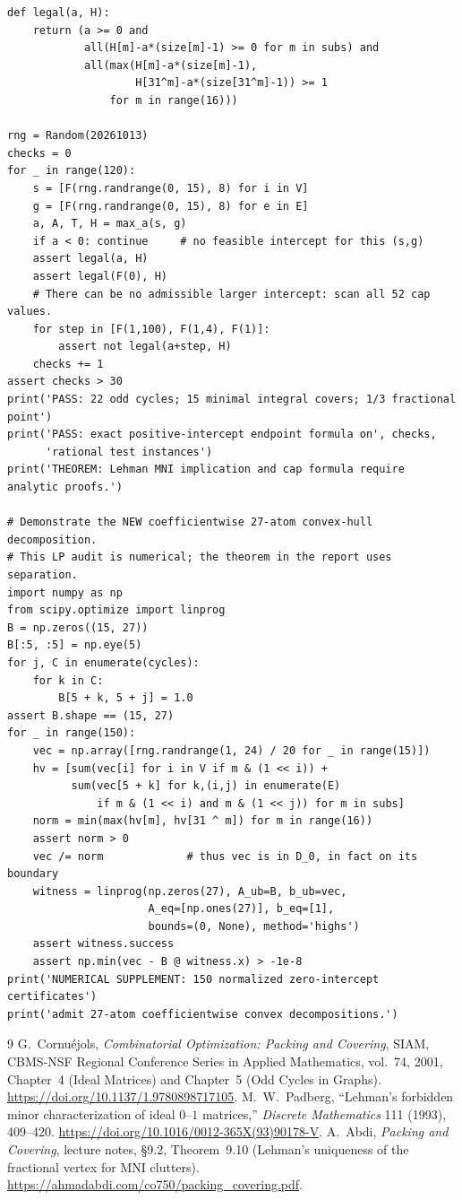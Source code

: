 \documentclass[11pt,a4paper]{ctexart}
\theoremstyle{remark}
\begin{document}
\begin{lstlisting}[caption={D2\_K5\_oddcycle\_positive\_active\_audit.py}]
def legal(a, H):
    return (a >= 0 and
            all(H[m]-a*(size[m]-1) >= 0 for m in subs) and
            all(max(H[m]-a*(size[m]-1),
                    H[31^m]-a*(size[31^m]-1)) >= 1
                for m in range(16)))

rng = Random(20261013)
checks = 0
for _ in range(120):
    s = [F(rng.randrange(0, 15), 8) for i in V]
    g = [F(rng.randrange(0, 15), 8) for e in E]
    a, A, T, H = max_a(s, g)
    if a < 0: continue     # no feasible intercept for this (s,g)
    assert legal(a, H)
    assert legal(F(0), H)
    # There can be no admissible larger intercept: scan all 52 cap values.
    for step in [F(1,100), F(1,4), F(1)]:
        assert not legal(a+step, H)
    checks += 1
assert checks > 30
print('PASS: 22 odd cycles; 15 minimal integral covers; 1/3 fractional point')
print('PASS: exact positive-intercept endpoint formula on', checks,
      'rational test instances')
print('THEOREM: Lehman MNI implication and cap formula require analytic proofs.')

# Demonstrate the NEW coefficientwise 27-atom convex-hull decomposition.
# This LP audit is numerical; the theorem in the report uses separation.
import numpy as np
from scipy.optimize import linprog
B = np.zeros((15, 27))
B[:5, :5] = np.eye(5)
for j, C in enumerate(cycles):
    for k in C:
        B[5 + k, 5 + j] = 1.0
assert B.shape == (15, 27)
for _ in range(150):
    vec = np.array([rng.randrange(1, 24) / 20 for _ in range(15)])
    hv = [sum(vec[i] for i in V if m & (1 << i)) +
          sum(vec[5 + k] for k,(i,j) in enumerate(E)
              if m & (1 << i) and m & (1 << j)) for m in subs]
    norm = min(max(hv[m], hv[31 ^ m]) for m in range(16))
    assert norm > 0
    vec /= norm             # thus vec is in D_0, in fact on its boundary
    witness = linprog(np.zeros(27), A_ub=B, b_ub=vec,
                      A_eq=[np.ones(27)], b_eq=[1],
                      bounds=(0, None), method='highs')
    assert witness.success
    assert np.min(vec - B @ witness.x) > -1e-8
print('NUMERICAL SUPPLEMENT: 150 normalized zero-intercept certificates')
print('admit 27-atom coefficientwise convex decompositions.')
\end{lstlisting}
\begin{thebibliography}{9}
G.~Cornu\'ejols, \emph{Combinatorial Optimization: Packing and Covering},
SIAM, CBMS-NSF Regional Conference Series in Applied Mathematics, vol.~74,
2001, Chapter~4 (Ideal Matrices) and Chapter~5 (Odd Cycles in Graphs).
\url{https://doi.org/10.1137/1.9780898717105}.
M.~W.~Padberg, ``Lehman's forbidden minor characterization of ideal
$0$--$1$ matrices,'' \emph{Discrete Mathematics} 111 (1993), 409--420.
\url{https://doi.org/10.1016/0012-365X(93)90178-V}.
A.~Abdi, \emph{Packing and Covering}, lecture notes, \S9.2,
Theorem~9.10 (Lehman's uniqueness of the fractional vertex for MNI clutters).
\url{https://ahmadabdi.com/co750/packing_covering.pdf}.
\end{thebibliography}
\end{document}
